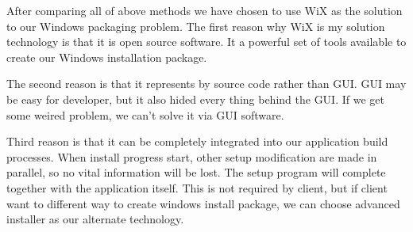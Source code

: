After comparing all of above methods we have chosen to use WiX as the solution to our Windows packaging problem.
The first reason why WiX is my solution technology is that it is open source software.
It a powerful set of tools available to create our Windows installation package.

The second reason is that it represents by source code rather than GUI.
GUI may be easy for developer, but it also hided every thing behind the GUI.
If we get some weired problem, we can't solve it via GUI software.

Third reason is that it can be completely integrated into our application build processes.
When install progress start, other setup modification are made in parallel, so no vital information will be lost.
The setup program will complete together with the application itself.
This is not required by client, but if client want to different way to create windows install package, we can choose advanced installer as our alternate technology.
